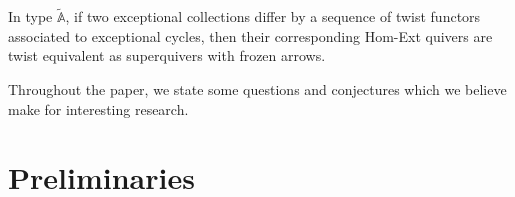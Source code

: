 \documentclass[12pt]{amsart}
\theoremstyle{plain}
\newenvironment{customthm}[1]
    {\renewcommand
    \theinnercustomthm{#1}\innercustomthm}{\endinnercustomthm}
\theoremstyle{definition}
\theoremstyle{remark}
\begin{document}
\begin{customthm}{D}[Theorem \ref{thm: superquiver twists}] \label{thm D}
In type $\tilde{\mathbb{A}}$, if two exceptional collections differ by {\color{black} a sequence of twist functors associated to exceptional cycles}, then their corresponding Hom-Ext quivers are twist equivalent as superquivers with frozen arrows.
\end{customthm}

Throughout the paper, we state some questions and conjectures which we believe make for interesting research.





\section{Preliminaries}\label{sec: prelim}
\end{document}
